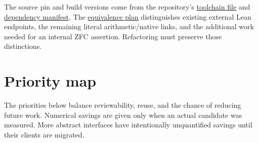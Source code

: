 \documentclass[11pt,letterpaper]{article}
\newcommand{\repo}{https://github.com/VladimirReshetnikov/ProveIt/blob/60e9c5d620c6c387d932876cfa2d9376f64ea56c}
\begin{document}
The source pin and build versions come from the repository's \href{\repo/lean-toolchain}{toolchain file} and \href{\repo/lake-manifest.json}{dependency manifest}. The \href{\repo/Computability/DiophantineConsistency/LEAN_EQUIVALENCE_PLAN.md}{equivalence plan} distinguishes existing external Lean endpoints, the remaining literal arithmetic/native links, and the additional work needed for an internal ZFC assertion. Refactoring must preserve those distinctions.

\section{Priority map}

The priorities below balance reviewability, reuse, and the chance of reducing future work. Numerical savings are given only when an actual candidate was measured. More abstract interfaces have intentionally unquantified savings until their clients are migrated.
\end{document}
